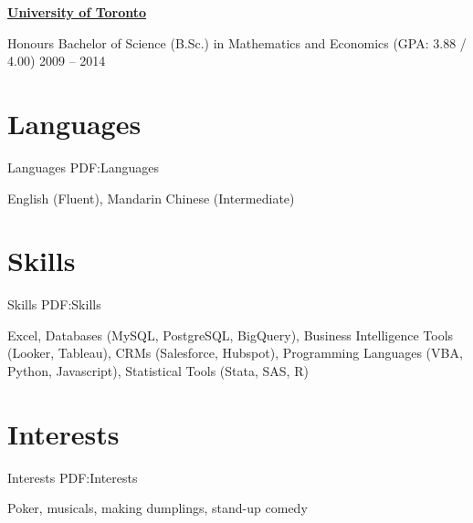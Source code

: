 \documentclass[letterpaper,10pt,oneside]{article}
\begin{document}
\begin{body}
\href{https://www.utoronto.ca/}
{\textbf{University of Toronto}}

\GapNoBreak
\BulletItem
Honours Bachelor of Science (B.Sc.) in Mathematics and Economics (GPA: 3.88 / 4.00)
\hfill
2009 -- 2014


\section
{Languages}
{Languages}
{PDF:Languages}

English (Fluent), Mandarin Chinese (Intermediate)


\section
{Skills}
{Skills}
{PDF:Skills}

Excel, Databases (MySQL, PostgreSQL, BigQuery), Business Intelligence Tools (Looker, Tableau), CRMs (Salesforce, Hubspot), Programming Languages (VBA, Python, Javascript), Statistical Tools (Stata, SAS, R)


\section
{Interests}
{Interests}
{PDF:Interests}

Poker, musicals, making dumplings, stand-up comedy

\end{body}
\end{document}

